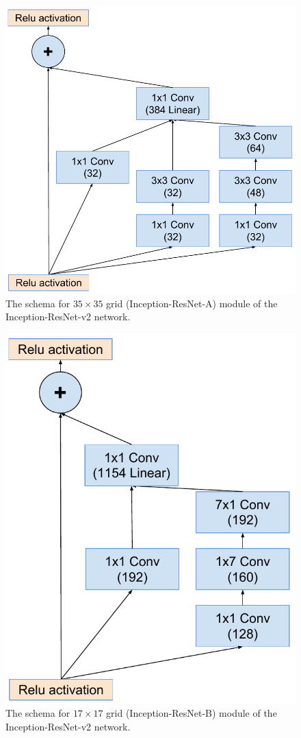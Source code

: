 \begin{figure}
\centering
\includegraphics[width=\linewidth]{resnetwide35x35}\caption{The schema for
  $35\times 35$ grid (Inception-ResNet-A) module of the Inception-ResNet-v2 network.}
\label{fig:resnetwide35x35module}
\end{figure}
\begin{figure}
\centering
\includegraphics[width=\linewidth]{resnetwide17x17}
\caption{The schema for $17\times 17$ grid (Inception-ResNet-B) module of the
  Inception-ResNet-v2  network.}
\label{fig:resnetwide17x17module}
\end{figure}
